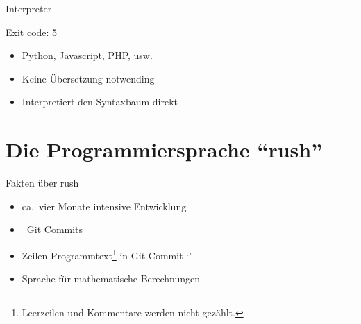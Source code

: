 \begin{frame}{Interpreter}
	\begin{minipage}{.36\textwidth}
	\end{minipage}%
	\hfill
	\hfill
	\begin{minipage}{.35\textwidth}
		{\LARGE Exit code: 5}
	\end{minipage}

	\begin{itemize}
		\item Python, Javascript, PHP, usw.
		\item Keine Übersetzung notwending
		\item[\Rightarrow] Interpretiert den Syntaxbaum direkt
	\end{itemize}
\end{frame}

\section{Die Programmiersprache \enquote{rush}}

\begin{frame}{Fakten über rush}
	\begin{figure}[h]
		\flushleft
		\hspace{.15cm} 
		\vspace{.2cm}
	\end{figure}
	\begin{itemize}
		\item ca.\ vier Monate intensive Entwicklung
		\item \rushCountCommits~Git Commits
		\item {} Zeilen Programmtext\footnote{Leerzeilen und Kommentare werden nicht gezählt.} in Git Commit `\rushCommit'
		\item Sprache für mathematische Berechnungen
	\end{itemize}
\end{frame}

